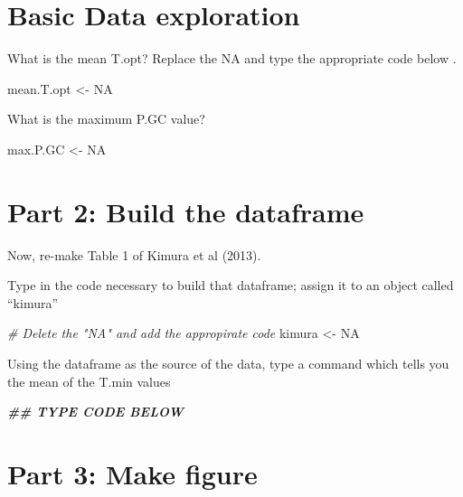 \documentclass[
]{book}
\newenvironment{Shaded}{\begin{snugshade}}{\end{snugshade}}
\newcommand{\CommentTok}[1]{\textcolor[rgb]{0.56,0.35,0.01}{\textit{#1}}}
\newcommand{\ConstantTok}[1]{\textcolor[rgb]{0.00,0.00,0.00}{#1}}
\newcommand{\DocumentationTok}[1]{\textcolor[rgb]{0.56,0.35,0.01}{\textbf{\textit{#1}}}}
\newcommand{\NormalTok}[1]{#1}
\newcommand{\OtherTok}[1]{\textcolor[rgb]{0.56,0.35,0.01}{#1}}
\begin{document}
\hypertarget{basic-data-exploration-1}{%
\section{Basic Data exploration}\label{basic-data-exploration-1}}

What is the mean T.opt? Replace the NA and type the appropriate code below .

\begin{Shaded}
\begin{Highlighting}[]
\NormalTok{mean.T.opt }\OtherTok{\textless{}{-}} \ConstantTok{NA}
\end{Highlighting}
\end{Shaded}

What is the maximum P.GC value?

\begin{Shaded}
\begin{Highlighting}[]
\NormalTok{max.P.GC }\OtherTok{\textless{}{-}} \ConstantTok{NA}
\end{Highlighting}
\end{Shaded}

\hypertarget{part-2-build-the-dataframe-1}{%
\section{Part 2: Build the dataframe}\label{part-2-build-the-dataframe-1}}

Now, re-make Table 1 of Kimura et al (2013).

Type in the code necessary to build that dataframe; assign it to an object called ``kimura''

\begin{Shaded}
\begin{Highlighting}[]
\CommentTok{\# Delete the "NA" and add the appropirate code}
\NormalTok{kimura  }\OtherTok{\textless{}{-}} \ConstantTok{NA}
\end{Highlighting}
\end{Shaded}

Using the dataframe as the source of the data, type a command which tells you the mean of the T.min values

\begin{Shaded}
\begin{Highlighting}[]
\DocumentationTok{\#\# TYPE CODE BELOW}
\end{Highlighting}
\end{Shaded}

\hypertarget{part-3-make-figure-1}{%
\section{Part 3: Make figure}\label{part-3-make-figure-1}}
\end{document}
